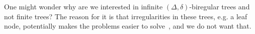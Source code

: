 One might wonder why are we interested in infinite $(\Delta, \delta)$-biregular trees and not finite trees?
The reason for it is that irregularities in these trees, e.g. a leaf node, potentially makes the problems easier to solve~\cite{DBLP:conf/wdag/Balliu0EHMOS20}, and we do not want that.

\clearpage
